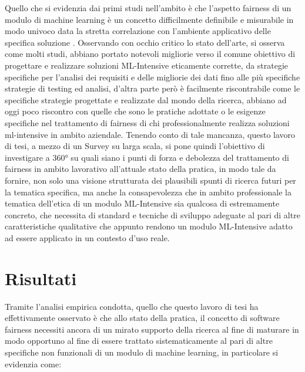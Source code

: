 Quello che si evidenzia dai primi studi nell'ambito è che l'aspetto fairness di un modulo di machine learning è un concetto difficilmente definibile e misurabile in modo univoco data la stretta correlazione con l'ambiente applicativo delle specifica soluzione \cite{FairnessDefinitionExplained}. Osservando con occhio critico lo stato dell'arte, si osserva come molti studi, abbiano portato notevoli migliorie verso il comune obiettivo di progettare e realizzare soluzioni ML-Intensive eticamente corrette, da strategie specifiche per l'analisi dei requisiti e delle migliorie dei dati fino alle più specifiche strategie di testing ed analisi, d'altra parte però è facilmente riscontrabile come le specifiche strategie progettate e realizzate dal mondo della ricerca, abbiano ad oggi poco riscontro con quelle che sono le pratiche adottate o le esigenze specifiche nel trattamento di fairness di chi professionalmente realizza soluzioni ml-intensive in ambito aziendale. Tenendo conto di tale mancanza, questo lavoro di tesi, a mezzo di un Survey su larga scala, si pone quindi l'obiettivo di investigare a 360° su quali siano i punti di forza e debolezza del trattamento di fairness in ambito lavorativo all'attuale stato della pratica, in modo tale da fornire, non solo una visione strutturata dei plausibili spunti di ricerca futuri per la tematica specifica, ma anche la consapevolezza che in ambito professionale la tematica dell'etica di un modulo ML-Intensive sia qualcosa di estremamente concreto, che necessita di standard e tecniche di sviluppo adeguate al pari di altre caratteristiche qualitative che appunto rendono un modulo ML-Intensive adatto ad essere applicato in un contesto d'uso reale.

\section{Risultati}
Tramite l'analisi empirica condotta, quello che questo lavoro di tesi ha effettivamente osservato è che allo stato della pratica, il concetto di software fairness necessiti ancora di un mirato supporto della ricerca al fine di maturare in modo opportuno al fine di essere trattato sistematicamente al pari di altre specifiche non funzionali di un modulo di machine learning, in particolare si evidenzia come:


